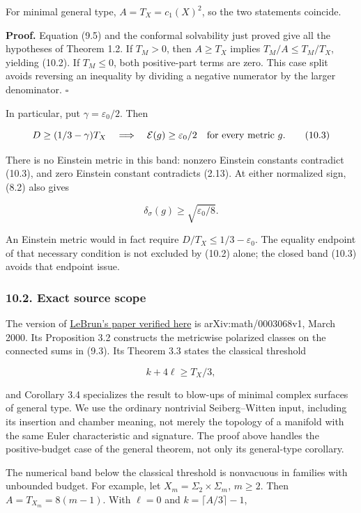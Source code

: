 \documentclass[
  11pt,
]{article}
\begin{document}
For minimal general type, \(A=T_X=c_1(X)^2\), so the two statements
coincide.

\textbf{Proof.} Equation (9.5) and the conformal solvability just proved
give all the hypotheses of Theorem 1.2. If \(T_M>0\), then \(A\ge T_X\)
implies \(T_M/A\le T_M/T_X\), yielding (10.2). If \(T_M\le0\), both
positive-part terms are zero. This case split avoids reversing an
inequality by dividing a negative numerator by the larger denominator.
\(\square\)

In particular, put \(\gamma=\varepsilon_0/2\). Then

\[
             D\ge(1/3-\gamma)T_X
 \quad\Longrightarrow\quad
             \mathcal E(g)\ge\varepsilon_0/2
             \quad\hbox{for every metric }g.             \tag{10.3}
\]

There is no Einstein metric in this band: nonzero Einstein constants
contradict (10.3), and zero Einstein constant contradicts (2.13). At
either normalized sign, (8.2) also gives

\[
                    \delta_\sigma(g)\ge\sqrt{\varepsilon_0/8}.
 \tag{10.4}
\]

An Einstein metric would in fact require \(D/T_X\le1/3-\varepsilon_0\).
The equality endpoint of that necessary condition is not excluded by
(10.2) alone; the closed band (10.3) avoids that endpoint issue.

\hypertarget{exact-source-scope}{%
\subsubsection{10.2. Exact source scope}\label{exact-source-scope}}

The version of \href{https://arxiv.org/pdf/math/0003068}{LeBrun's paper
verified here} is arXiv:math/0003068v1, March 2000. Its Proposition 3.2
constructs the metricwise polarized classes on the connected sums in
(9.3). Its Theorem 3.3 states the classical threshold

\[
                              k+4\ell\ge T_X/3,
\]

and Corollary 3.4 specializes the result to blow-ups of minimal complex
surfaces of general type. We use the ordinary nontrivial Seiberg--Witten
input, including its insertion and chamber meaning, not merely the
topology of a manifold with the same Euler characteristic and signature.
The proof above handles the positive-budget case of the general theorem,
not only its general-type corollary.

The numerical band below the classical threshold is nonvacuous in
families with unbounded budget. For example, let
\(X_m=\Sigma_2\times\Sigma_m\), \(m\ge2\). Then \(A=T_{X_m}=8(m-1)\).
With \(\ell=0\) and \(k=\lceil A/3\rceil-1\),
\end{document}
